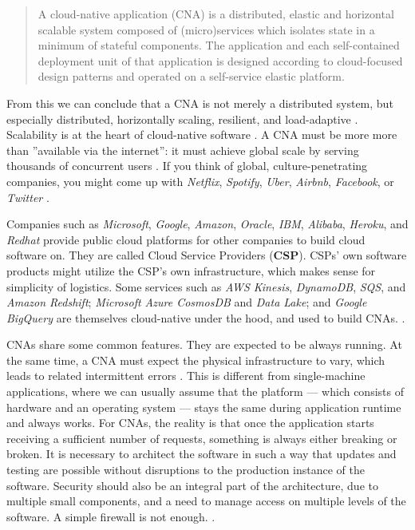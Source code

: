\documentclass[utf8,english]{gradu3}
\begin{document}
\begin{quote}
  A cloud-native application (CNA) is a distributed, elastic and horizontal
  scalable system composed of (micro)services which isolates state in a minimum
  of stateful components. The application and each self-contained deployment
  unit of that application is designed according to cloud-focused design
  patterns and operated on a self-service elastic platform.
\end{quote}

From this we can conclude that a CNA is not merely a distributed system, but
especially distributed, horizontally scaling, resilient, and load-adaptive
\parencite[13]{Kratzke2017}. Scalability is at the heart of cloud-native
software \parencite{CNAF2018}. A CNA must be more more than ''available via the
internet'': it must achieve global scale by serving thousands of concurrent
users \parencite[17]{Gannon2017}. If you think of global, culture-penetrating
companies, you might come up with \textit{Netflix}, \textit{Spotify},
\textit{Uber}, \textit{Airbnb}, \textit{Facebook}, or \textit{Twitter}
\parencites{Gannon2017}{Patrizio2018}.

Companies such as \textit{Microsoft}, \textit{Google}, \textit{Amazon},
\textit{Oracle}, \textit{IBM}, \textit{Alibaba}, \textit{Heroku}, and
\textit{Redhat} provide public cloud platforms for other companies to build
cloud software on. They are called Cloud Service Providers (\textbf{CSP}). CSPs'
own software products might utilize the CSP's own infrastructure, which makes
sense for simplicity of logistics. Some services such as \textit{AWS Kinesis},
\textit{DynamoDB}, \textit{SQS}, and \textit{Amazon Redshift}; \textit{Microsoft
  Azure CosmosDB} and \textit{Data Lake}; and \textit{Google BigQuery} are
themselves cloud-native under the hood, and used to build CNAs.
\parencite[17]{Gannon2017}.

CNAs share some common features. They are expected to be always running. At the
same time, a CNA must expect the physical infrastructure to vary, which leads to
related intermittent errors \parencite[17]{Gannon2017}. This is different from
single-machine applications, where we can usually assume that the platform —
which consists of hardware and an operating system --- stays the same during
application runtime and always works. For CNAs, the reality is that once the
application starts receiving a sufficient number of requests, something is
always either breaking or broken. It is necessary to architect the software in
such a way that updates and testing are possible without disruptions to the
production instance of the software. Security should also be an integral part of
the architecture, due to multiple small components, and a need to manage access
on multiple levels of the software. A simple firewall is not enough.
\parencite[17]{Gannon2017}.
\end{document}
